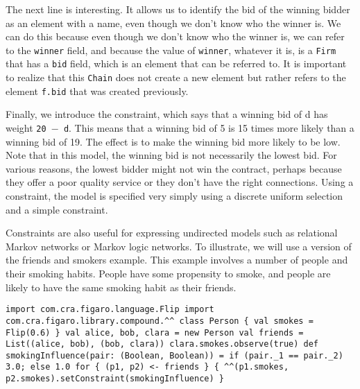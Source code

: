The next line is interesting. It allows us to identify the bid of the winning bidder as an element with a name, even though we don't know who the winner is. We can do this because even though we don't know who the winner is, we can refer to the \texttt{winner} field, and because the value of \texttt{winner}, whatever it is, is a \texttt{Firm} that has a \texttt{bid} field, which is an element that can be referred to. It is important to realize that this \texttt{Chain} does not create a new element but rather refers to the element \texttt{f.bid} that was created previously.

Finally, we introduce the constraint, which says that a winning bid of d has weight \texttt{20 $-$ d}. This means that a winning bid of 5 is 15 times more likely than a winning bid of 19. The effect is to make the winning bid more likely to be low. Note that in this model, the winning bid is not necessarily the lowest bid. For various reasons, the lowest bidder might not win the contract, perhaps because they offer a poor quality service or they don't have the right connections. Using a constraint, the model is specified very simply using a discrete uniform selection and a simple constraint.

Constraints are also useful for expressing undirected models such as relational Markov networks or Markov logic networks. To illustrate, we will use a version of the friends and smokers example. This example involves a number of people and their smoking habits. People have some propensity to smoke, and people are likely to have the same smoking habit as their friends.

\begin{flushleft}
\texttt{import com.cra.figaro.language.Flip
\newline import com.cra.figaro.library.compound.\textasciicircum \textasciicircum
\newline 
\newline class Person \{
\newline \tab val smokes = Flip(0.6) 
\newline \} 
\newline 
\newline val alice, bob, clara = new Person
\newline val friends = List((alice, bob), (bob, clara))
\newline clara.smokes.observe(true) 
\newline
{}
\newline def smokingInfluence(pair: (Boolean, Boolean)) = 
\newline \tab if (pair.\_1 == pair.\_2) 3.0; else 1.0
\newline
\newline for \{ (p1, p2) <- friends \} \{
\newline \tab \textasciicircum \textasciicircum(p1.smokes, p2.smokes).setConstraint(smokingInfluence)
\newline \} }  
\end{flushleft}

